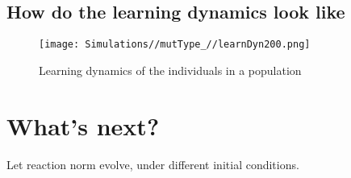\documentclass[]{article}
\begin{document}
\hypertarget{how-do-the-learning-dynamics-look-like}{%
\subsection{How do the learning dynamics look
like}\label{how-do-the-learning-dynamics-look-like}}

\begin{figure}
\centering
\texttt{[image: Simulations//mutType\_//learnDyn200.png]}
\caption{Learning dynamics of the individuals in a population}
\end{figure}

\hypertarget{whats-next}{%
\section{What's next?}\label{whats-next}}

Let reaction norm evolve, under different initial conditions.
\end{document}
